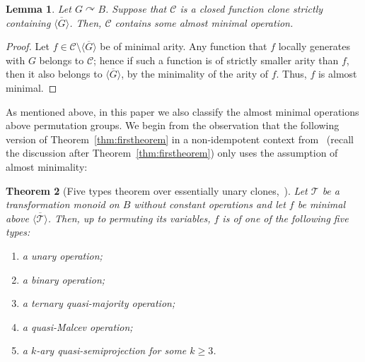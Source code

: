 \documentclass{article}
\newtheorem{theorem}{Theorem}[section]
\newtheorem{lemma}[theorem]{Lemma}
\theoremstyle{remark}
\theoremstyle{definition}
\def\acts{\curvearrowright}
\begin{document}
\begin{lemma}\label{lem:existencealmost} Let $G\acts B$. Suppose that $\mathcal{C}$ is a closed function clone strictly containing $\overline{\langle G\rangle}$. Then, $\mathcal{C}$ contains some almost minimal operation.
\end{lemma}
\begin{proof}
Let $f\in\mathcal{C}\setminus\overline{\langle{G}\rangle}$ be of minimal arity. Any function that  $f$ locally generates with $G$ belongs to $\mathcal C$; hence if such a function is of strictly smaller arity than $f$, then it also belongs to $\overline{\langle{G}\rangle}$, by the minimality of the arity of $f$. Thus,  $f$ is almost minimal. 
\end{proof}


As mentioned above, in this paper we also classify the almost minimal operations above permutation groups. We begin from the observation that the following version of Theorem~\ref{thm:firstheorem} in a non-idempotent context from~\cite[Theorem 6.1.42]{BodCSP} (recall the discussion after Theorem~\ref{thm:firstheorem}) only uses the assumption of almost minimality:

\begin{theorem}[Five types theorem over essentially unary clones,~\cite{BodCSP}]\label{fivetypes} Let $\mathcal{T}$ be a transformation monoid on $B$ without constant operations and let $f$ be minimal above $\overline{\langle\mathcal{T}\rangle}$. Then, up to permuting its variables, $f$ is of one of the following five types:
\begin{enumerate}
    \item a unary operation;
    \item a binary operation;
    \item a ternary quasi-majority operation;
    \item a quasi-Malcev operation;
    \item a $k$-ary quasi-semiprojection for some $k\geq 3$.
\end{enumerate}
\end{theorem}
\end{document}

